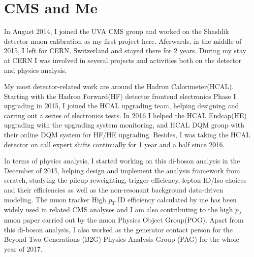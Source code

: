 \section{CMS and Me} %
In August 2014, I joined the UVA CMS group and worked on the Shashlik detector muon calibration as my first project here. Aferwards, in the middle of 2015, I left for CERN, Switzerland and stayed there for 2 years. During my stay at CERN I was involved in several projects and activities both on the detector and physics analysis. 

\vspace{0.3cm}
My most detector-related work are around the Hadron Calorimeter(HCAL). Starting with the Hadron Forward(HF) detector frontend electronics Phase I upgrading in 2015, I joined the HCAL upgrading team, helping designing and carring out a series of electronics tests. In 2016 I helped the HCAL Endcap(HE) upgrading with the upgrading system monitoring, and HCAL DQM group with their online DQM system for HF/HE upgrading. Besides, I was taking the HCAL detector on call expert shifts continually for 1 year and a half since 2016.

\vspace{0.3cm}
In terms of physics analysis, I started working on this di-boson analysis in the December of 2015, helping design and implement the analysis framework from scratch, studying the pileup reweighting, trigger efficiency, lepton ID/Iso choices and their efficiencies as well as the non-resonant background data-driven modeling. The muon tracker High $p_{T}$ ID efficiency calculated by me has been widely used in related CMS analyses and I am also contributing to the high $p_{T}$ muon paper carried out by the muon Physics Object Group(POG). Apart from this di-boson analysis, I also worked as the generator contact person for the Beyond Two Generations (B2G) Physics Analysis Group (PAG) for the whole year of 2017.
